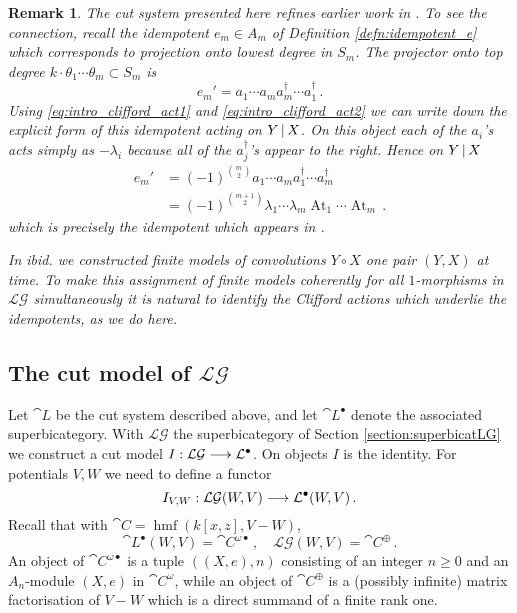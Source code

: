 \documentclass[english,letter paper,12pt,leqno]{article}
\theoremstyle{example}
\newtheorem{remark}[theorem]{Remark}
\numberwithin{equation}{section}
\def\LG{\mathcal{LG}}
\DeclareMathOperator{\hmf}{hmf}
\DeclareMathOperator{\At}{At}
\begin{document}
\begin{remark}\label{remark:relation_to_toby_paper} The cut system presented here refines earlier work in \cite{dm1102.2957}. To see the connection, recall the idempotent $e_m \in A_m$ of Definition \ref{defn:idempotent_e} which corresponds to projection onto lowest degree in $S_m$. The projector onto top degree $k \cdot \theta_1 \cdots \theta_m \subset S_m$ is 
\[
e_m' = a_1 \cdots a_m a_m^\dagger \cdots a_1^\dagger\,.
\]
Using \eqref{eq:intro_clifford_act1} and \eqref{eq:intro_clifford_act2} we can write down the explicit form of this idempotent acting on $Y \,|\, X$. On this object each of the $a_i$'s acts simply as $- \lambda_i$ because all of the $a_j^\dagger$'s appear to the right. Hence on $Y \,|\, X$
\begin{align*}
e_m' &= (-1)^{\binom{m}{2}} a_1 \cdots a_m a_1^\dagger \cdots a_m^\dagger \\
&= (-1)^{\binom{m+1}{2}} \lambda_1 \cdots \lambda_m \At_1 \cdots \At_m\,.
\end{align*}
which is precisely the idempotent which appears in \cite[Corollary 10.4]{dm1102.2957}.

In \emph{ibid.} we constructed finite models of convolutions $Y \circ X$ one pair $(Y,X)$ at time. To make this assignment of finite models coherently for all $1$-morphisms in $\LG$ simultaneously it is natural to identify the Clifford actions which underlie the idempotents, as we do here.
\end{remark}

\subsection{The cut model of $\LG$}

Let $\cat{L}$ be the cut system described above, and let $\cat{L}^\bullet$ denote the associated superbicategory. With $\LG$ the superbicategory of Section \ref{section:superbicatLG} we construct a cut model $I: \LG \lto \cat{L}^\bullet$. On objects $I$ is the identity. For potentials $V,W$ we need to define a functor
\begin{equation}\label{eq:cut_model_equiv}
I_{V,W}: \LG(W,V) \lto \cat{L}^\bullet(W,V)\,.
\end{equation}
Recall that with $\cat{C} = \hmf(k[x,z], V - W)$,
\[
\cat{L}^\bullet(W,V) = \cat{C}^{\omega \bullet}\,, \quad \LG(W,V) = \cat{C}^{\oplus}\,.
\]
An object of $\cat{C}^{\omega \bullet}$ is a tuple $((X,e), n)$ consisting of an integer $n \ge 0$ and an $A_n$-module $(X,e)$ in $\cat{C}^\omega$, while an object of $\cat{C}^{\oplus}$ is a (possibly infinite) matrix factorisation of $V - W$ which is a direct summand of a finite rank one.
\end{document}
